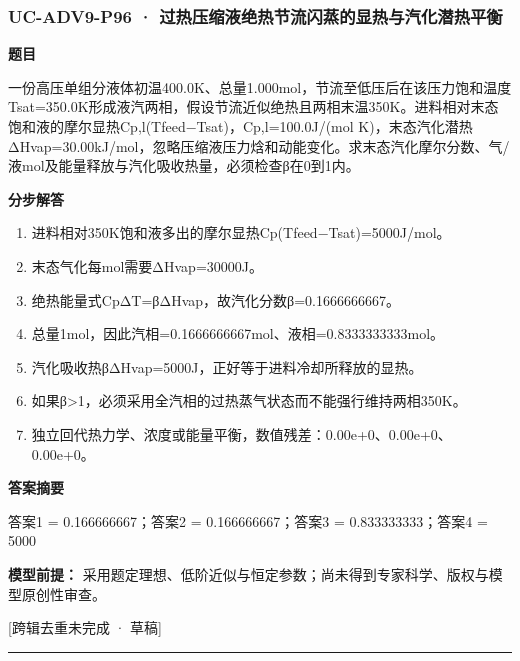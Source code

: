 \documentclass[UTF8,11pt,a4paper]{ctexart}
\begin{document}
\subsubsection*{UC-ADV9-P96 · 过热压缩液绝热节流闪蒸的显热与汽化潜热平衡}
\noindent\textbf{题目}\par
一份高压单组分液体初温400.0K、总量1.000mol，节流至低压后在该压力饱和温度Tsat=350.0K形成液汽两相，假设节流近似绝热且两相末温350K。进料相对末态饱和液的摩尔显热Cp,l(Tfeed−Tsat)，Cp,l=100.0J/(mol K)，末态汽化潜热ΔHvap=30.00kJ/mol，忽略压缩液压力焓和动能变化。求末态汽化摩尔分数、气/液mol及能量释放与汽化吸收热量，必须检查β在0到1内。\par
\medskip\noindent\textbf{分步解答}
\begin{enumerate}
\item 进料相对350K饱和液多出的摩尔显热Cp(Tfeed−Tsat)=5000J/mol。
\item 末态气化每mol需要ΔHvap=30000J。
\item 绝热能量式CpΔT=βΔHvap，故汽化分数β=0.1666666667。
\item 总量1mol，因此汽相=0.1666666667mol、液相=0.8333333333mol。
\item 汽化吸收热βΔHvap=5000J，正好等于进料冷却所释放的显热。
\item 如果β>1，必须采用全汽相的过热蒸气状态而不能强行维持两相350K。
\item 独立回代热力学、浓度或能量平衡，数值残差：0.00e+0、0.00e+0、0.00e+0。
\end{enumerate}
\noindent\textbf{答案摘要}\par
答案1 = 0.166666667；答案2 = 0.166666667；答案3 = 0.833333333；答案4 = 5000\par
\noindent\textbf{模型前提：}
采用题定理想、低阶近似与恒定参数；尚未得到专家科学、版权与模型原创性审查。\par
\noindent\textcolor{red!65!black}{[跨辑去重未完成 · 草稿]} \par
\medskip\hrule\medskip
{}
\end{document}
